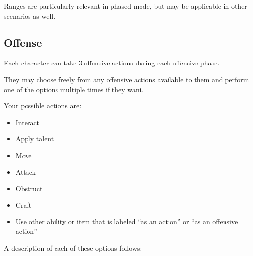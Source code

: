 Ranges are particularly relevant in phased mode, but may be applicable in other scenarios as well.



\subsection{Offense}

Each character can take 3 offensive actions during each offensive phase.

They may choose freely from any offensive actions available to them and perform one of the options multiple times if they want.

Your possible actions are:

\begin{itemize}
	\item Interact
	\item Apply talent
	\item Move
	\item Attack
	\item Obstruct
	\item Craft
	\item Use other ability or item that is labeled ``as an action'' or ``as an offensive action''
\end{itemize}

A description of each of these options follows:


